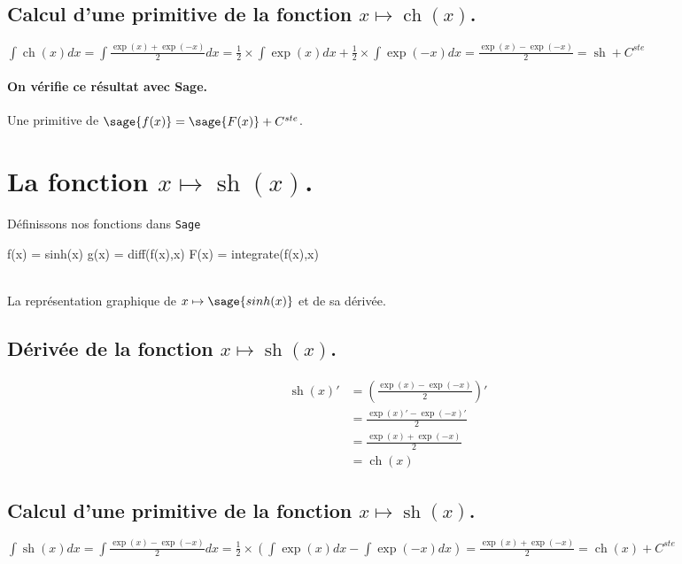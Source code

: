 \documentclass[a4paper,12pt]{report}
\renewcommand{\sinh}{\mathop{\mathrm{sh}}}
\renewcommand{\cosh}{\mathop{\mathrm{ch}}}
\begin{document}
\subsection{Calcul d'une primitive de la fonction  $x \mapsto \cosh(x)$.}
$\int \cosh(x) dx = \int \frac{\exp(x)+ \exp(-x)}{2} dx = \frac{1}{2} \times \int \exp(x) dx + \frac{1}{2} \times \int \exp(-x) dx = \frac{ \exp(x) - \exp(-x) }{2} = \sinh + C^{ste}$
\paragraph{On vérifie ce résultat avec Sage.}
Une primitive de $\sage{f(x)} = \sage{F(x)} + C^{ste}$.





\section{La fonction  $x \mapsto \sinh(x)$.}
Définissons nos fonctions dans {\texttt{Sage}}
\begin{sageblock}
    f(x) = sinh(x)
    g(x) = diff(f(x),x)
    F(x) = integrate(f(x),x)
\end{sageblock}

\begin{center}
 \\
La représentation graphique de $x \mapsto \sage{sinh(x)} $ et de sa dérivée. 
\end{center}


\subsection{Dérivée de la fonction $x \mapsto \sinh(x)$.}
\begin{align*}
\sinh(x)' & = \left( \frac{\exp(x)-\exp(-x)}{2} \right)' \\ 
& = \frac{\exp(x)'-\exp(-x)'}{2} \\
& = \frac{\exp(x)+\exp(-x)}{2} \\
& = \cosh(x)
\end{align*}


\subsection{Calcul d'une primitive de la fonction  $x \mapsto \sinh(x)$.}
$\int \sinh(x) dx = \int \frac{\exp(x)- \exp(-x)}{2} dx = \frac{1}{2} \times \left( \int \exp(x) dx - \int \exp(-x) dx \right) = \frac{ \exp(x) + \exp(-x) }{2} = \cosh(x) + C^{ste}$
\end{document}
